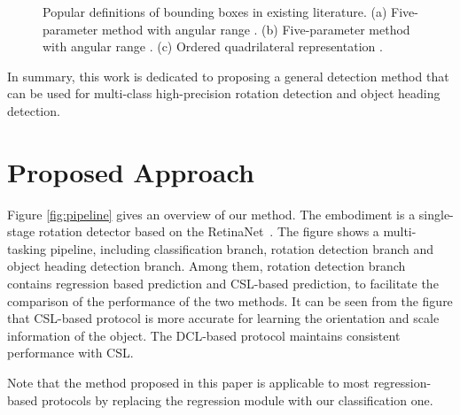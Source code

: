 \documentclass[10pt,journal,compsoc]{IEEEtran}
\begin{document}
\begin{figure}[!tb]
	\centering
	\centering
	\caption{Popular definitions of bounding boxes in existing literature. (a) Five-parameter method with  angular range \cite{yang2019scrdet, yang2021r3det}. (b) Five-parameter method with  angular range \cite{ma2018arbitrary, ding2018learning}. (c) Ordered quadrilateral representation \cite{liao2018textboxes++, liu2019omnidirectional, qian2021learning, xu2020gliding}.}
	\label{fig:bbox_defination}
	\vspace{-10pt}
\end{figure}

In summary, this work is dedicated to proposing a general detection method that can be used for multi-class high-precision rotation detection and object heading detection.

\section{Proposed Approach}\label{sec:method}
Figure \ref{fig:pipeline} gives an overview of our method. The embodiment is a single-stage rotation detector based on the RetinaNet~\cite{lin2017focal}. The figure shows a multi-tasking pipeline, including classification branch, rotation detection branch and object heading detection branch. Among them, rotation detection branch contains regression based prediction and CSL-based prediction, to facilitate the comparison of the performance of the two methods. It can be seen from the figure that CSL-based protocol is more accurate for learning the orientation and scale information of the object. The DCL-based protocol maintains consistent performance with CSL. 

Note that the method proposed in this paper is applicable to most regression-based protocols by replacing the regression module with our classification one.
\end{document}
